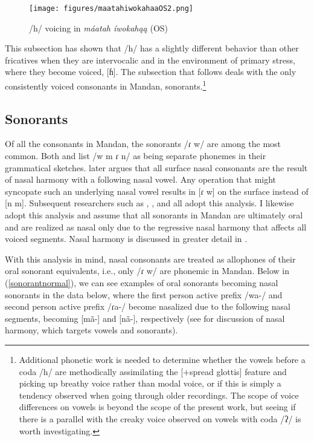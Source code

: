 \begin{figure}
\caption{/h/ voicing in \textit{máatah íwokahąą} (OS)}\label{intervocalicH3}
\texttt{[image: figures/maatahiwokahaaOS2.png]}
\end{figure}

This subsection has shown that /h/ has a slightly different behavior than other fricatives when they are intervocalic and in the environment of primary stress, where they become voiced, [ɦ]. The subsection that follows deals with the only consistently voiced consonants in Mandan, sonorants.\footnote{Additional phonetic work is needed to determine whether the vowels before a coda /h/ are methodically assimilating the [$+$spread glottis] feature and picking up breathy voice rather than modal voice, or if this is simply a tendency observed when going through older recordings. The scope of voice differences on vowels is beyond the scope of the present work, but seeing if there is a parallel with the creaky voice observed on vowels with coda /ʔ/ is worth investigating.}

\subsection{Sonorants}\label{sonorants}

Of all the consonants in Mandan, the sonorants /ɾ w/ are among the most common. Both \citet[190]{will1906} and \citet[2]{kennard1936} list /w m ɾ n/ as being separate phonemes in their grammatical sketches. \citet[18]{hollow1970} later argues that all surface nasal consonants are the result of nasal harmony with a following nasal vowel. Any operation that might syncopate such an underlying nasal vowel results in [ɾ w] on the surface instead of [n m]. Subsequent researchers such as \citet{coberly1979}, \citet{carter1991a,carter1991b}, and \citet{mixco1997a,mixco1997b} all adopt this analysis. I likewise adopt this analysis and assume that all sonorants in Mandan are ultimately oral and are realized as nasal only due to the regressive nasal harmony that affects all voiced segments. Nasal harmony is discussed in greater detail in .

With this analysis in mind, nasal consonants are treated as allophones of their oral sonorant equivalents, i.e., only /ɾ w/ are phonemic in Mandan. Below in (\ref{sonorantnormal}), we can see examples of oral sonorants becoming nasal sonorants in the data below, where the first person active prefix /wa-/ and second person active prefix /ɾa-/ become nasalized due to the following nasal segments, becoming [mã-] and [nã-], respectively (see  for discussion of nasal harmony, which targets vowels and sonorants).

